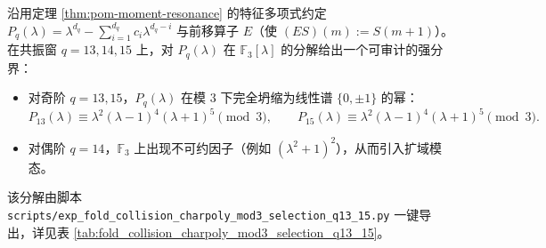 \begin{remark}\label{rem:pom-charpoly-mod3-selection}
沿用定理 \ref{thm:pom-moment-resonance} 的特征多项式约定
\(
P_q(\lambda)=\lambda^{d_q}-\sum_{i=1}^{d_q}c_i\lambda^{d_q-i}
\)
与前移算子 \(E\)（使 \((ES)(m):=S(m+1)\)）。
在共振窗 \(q=13,14,15\) 上，对 \(P_q(\lambda)\) 在 \(\mathbb{F}_3[\lambda]\) 的分解给出一个可审计的强分界：
\begin{itemize}
  \item 对奇阶 \(q=13,15\)，\(P_q(\lambda)\) 在模 \(3\) 下完全坍缩为线性谱 \(\{0,\pm 1\}\) 的幂：
  \[
  P_{13}(\lambda)\equiv \lambda^2(\lambda-1)^4(\lambda+1)^5\pmod 3,
  \qquad
  P_{15}(\lambda)\equiv \lambda^2(\lambda-1)^4(\lambda+1)^5\pmod 3.
  \]
  \item 对偶阶 \(q=14\)，\(\mathbb{F}_3\) 上出现不可约因子（例如 \((\lambda^2+1)^2\)），从而引入扩域模态。
\end{itemize}
该分解由脚本 \texttt{scripts/exp\_fold\_collision\_charpoly\_mod3\_selection\_q13\_15.py} 一键导出，详见表 \ref{tab:fold_collision_charpoly_mod3_selection_q13_15}。
\end{remark}



